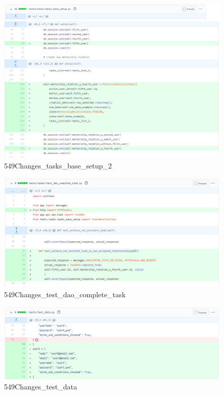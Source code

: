 \documentclass{article}
\begin{document}
\begin{figure}[tph!]
\centerline{\includegraphics[totalheight=15cm, width=16cm]{549Changes_tasks_base_setup_2.png}}
    \caption{549Changes\_tasks\_base\_setup\_2}
    \label{fig:verticalcell}
\end{figure}
\begin{figure}[tph!]
\centerline{\includegraphics[totalheight=13cm, width=17cm]{549Changes_test_dao_complete_task.png}}
    \caption{549Changes\_test\_dao\_complete\_task}
    \label{fig:verticalcell}
\end{figure}
\begin{figure}[tph!]
\centerline{\includegraphics[totalheight=10cm, width=18cm]{549Changes_test_data.png}}
    \caption{549Changes\_test\_data}
    \label{fig:verticalcell}
\end{figure}
\vfill
\clearpage
\end{document}
